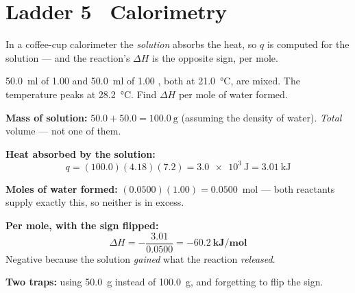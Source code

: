 \documentclass{apchem-worksheet}
\begin{document}
\section*{\sffamily Ladder 5 \textbullet\ Calorimetry}
 

In a coffee-cup calorimeter the \emph{solution} absorbs the heat, so
$q$ is computed for the solution --- and the reaction's $\Delta H$ is the
opposite sign, per mole.

\begin{workedexample}[I do: a neutralization]
\SI{50.0}{\milli\litre} of \SI{1.00}{\Molar}  and
\SI{50.0}{\milli\litre} of \SI{1.00}{\Molar} , both at
\SI{21.0}{\celsius}, are mixed. The temperature peaks at
\SI{28.2}{\celsius}. Find $\Delta H$ per mole of water formed.

\textbf{Mass of solution:} $50.0 + 50.0 = \SI{100.0}{\gram}$ (assuming
the density of water). \emph{Total} volume --- not one of them.

\textbf{Heat absorbed by the solution:}
\[ q = (100.0)(4.18)(7.2) = \SI{3.0e3}{\joule} =
   \SI{3.01}{\kilo\joule} \]

\textbf{Moles of water formed:} $(0.0500)(1.00) = \num{0.0500}$~mol ---
both reactants supply exactly this, so neither is in excess.

\textbf{Per mole, with the sign flipped:}
\[ \Delta H = -\frac{3.01}{0.0500} = \mathbf{-60.2~kJ/mol} \]
Negative because the solution \emph{gained} what the reaction
\emph{released}.

\textbf{Two traps:} using \SI{50.0}{\gram} instead of \SI{100.0}{\gram},
and forgetting to flip the sign.
\end{workedexample}
\end{document}
